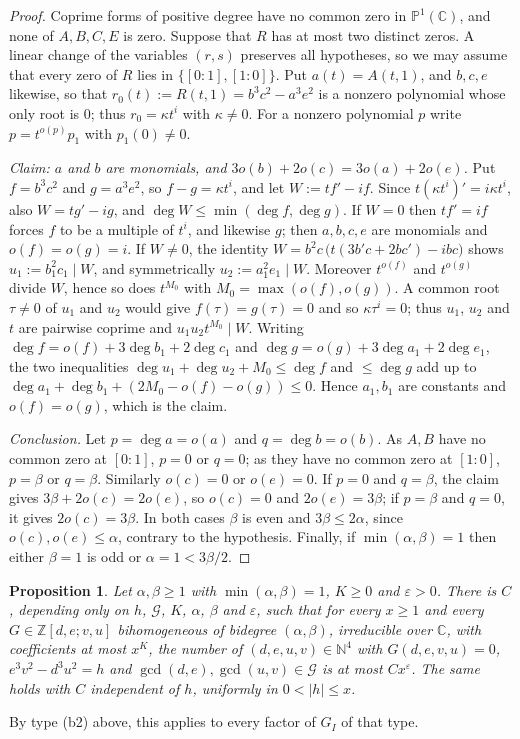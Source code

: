 \documentclass[11pt,reqno]{amsart}
\newtheorem{proposition}[theorem]{Proposition}
\theoremstyle{definition}
\theoremstyle{remark}
\numberwithin{equation}{section}
\newcommand{\Z}{\mathbb Z}
\newcommand{\N}{\mathbb N}
\newcommand{\C}{\mathbb C}
\newcommand{\PP}{\mathbb P}
\begin{document}
\begin{proof}
Coprime forms of positive degree have no common zero in $\PP^1(\C)$, and none
of $A,B,C,E$ is zero. Suppose that $R$ has at most two distinct zeros. A
linear change of the variables $(r,s)$ preserves all hypotheses, so we may
assume that every zero of $R$ lies in $\{[0:1],[1:0]\}$. Put $a(t)=A(t,1)$,
and $b,c,e$ likewise, so that $r_0(t):=R(t,1)=b^3c^2-a^3e^2$ is a nonzero
polynomial whose only root is $0$; thus $r_0=\kappa t^i$ with $\kappa\ne0$.
For a nonzero polynomial $p$ write $p=t^{o(p)}p_1$ with $p_1(0)\ne0$.

\emph{Claim: $a$ and $b$ are monomials, and
$3o(b)+2o(c)=3o(a)+2o(e)$.} Put $f=b^3c^2$ and $g=a^3e^2$, so $f-g=\kappa
t^i$, and let $W:=tf'-if$. Since $t(\kappa t^i)'=i\kappa t^i$, also
$W=tg'-ig$, and $\deg W\le\min(\deg f,\deg g)$. If $W=0$ then $tf'=if$
forces $f$ to be a multiple of $t^i$, and likewise $g$; then $a,b,c,e$ are
monomials and $o(f)=o(g)=i$. If $W\ne0$, the identity
$W=b^2c\,\bigl(t(3b'c+2bc')-ibc\bigr)$ shows $u_1:=b_1^2c_1\mid W$, and
symmetrically $u_2:=a_1^2e_1\mid W$. Moreover $t^{o(f)}$ and $t^{o(g)}$
divide $W$, hence so does $t^{M_0}$ with $M_0=\max(o(f),o(g))$. A common root
$\tau\ne0$ of $u_1$ and $u_2$ would give $f(\tau)=g(\tau)=0$ and so
$\kappa\tau^i=0$; thus $u_1$, $u_2$ and $t$ are pairwise coprime and
$u_1u_2t^{M_0}\mid W$. Writing $\deg f=o(f)+3\deg b_1+2\deg c_1$ and
$\deg g=o(g)+3\deg a_1+2\deg e_1$, the two inequalities
$\deg u_1+\deg u_2+M_0\le\deg f$ and $\le\deg g$ add up to
$\deg a_1+\deg b_1+(2M_0-o(f)-o(g))\le0$. Hence $a_1,b_1$ are constants and
$o(f)=o(g)$, which is the claim.

\emph{Conclusion.} Let $p=\deg a=o(a)$ and $q=\deg b=o(b)$. As $A,B$ have no
common zero at $[0:1]$, $p=0$ or $q=0$; as they have no common zero at
$[1:0]$, $p=\beta$ or $q=\beta$. Similarly $o(c)=0$ or $o(e)=0$. If $p=0$ and
$q=\beta$, the claim gives $3\beta+2o(c)=2o(e)$, so $o(c)=0$ and
$2o(e)=3\beta$; if $p=\beta$ and $q=0$, it gives $2o(c)=3\beta$. In both
cases $\beta$ is even and $3\beta\le2\alpha$, since $o(c),o(e)\le\alpha$,
contrary to the hypothesis. Finally, if $\min(\alpha,\beta)=1$ then either
$\beta=1$ is odd or $\alpha=1<3\beta/2$.
\end{proof}

\begin{proposition}\label{prop:lowdeg}
Let $\alpha,\beta\ge1$ with $\min(\alpha,\beta)=1$, $K\ge0$ and
$\varepsilon>0$. There is $C$, depending only on $h$, $\mathcal G$, $K$,
$\alpha$, $\beta$ and $\varepsilon$, such that for every $x\ge1$ and every
$G\in\Z[d,e;v,u]$ bihomogeneous of bidegree $(\alpha,\beta)$, irreducible
over $\C$, with coefficients at most $x^K$, the number of $(d,e,u,v)\in\N^4$
with $G(d,e,v,u)=0$, $e^3v^2-d^3u^2=h$ and $\gcd(d,e),\gcd(u,v)\in\mathcal G$
is at most $Cx^{\varepsilon}$. The same holds with $C$ independent of $h$,
uniformly in $0<|h|\le x$.
\end{proposition}
By type (b2) above, this applies to every factor of $G_I$ of that type.
\end{document}
